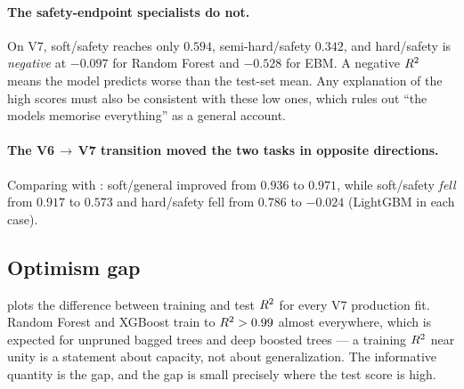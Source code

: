 \paragraph{The safety-endpoint specialists do not.}
\label{sec:safety-anomaly}
On V7, soft/safety reaches only $0.594$, semi-hard/safety $0.342$, and
hard/safety is \emph{negative} at $-0.097$ for Random Forest and
$-0.528$ for EBM. A negative $R^2$ means the model predicts worse than
the test-set mean. Any explanation of the high scores must also be
consistent with these low ones, which rules out ``the models memorise
everything'' as a general account.

\paragraph{The V6\,$\rightarrow$\,V7 transition moved the two tasks in
opposite directions.} Comparing  with
: soft/general improved from $0.936$ to
$0.971$, while soft/safety \emph{fell} from $0.917$ to $0.573$ and
hard/safety fell from $0.786$ to $-0.024$ (LightGBM in each case).



\subsection{Optimism gap}

 plots the difference between training
and test $R^2$ for every V7 production fit. Random Forest and XGBoost
train to $R^2 > 0.99$ almost everywhere, which is expected for
unpruned bagged trees and deep boosted trees --- a training $R^2$ near
unity is a statement about capacity, not about generalization. The
informative quantity is the gap, and the gap is small precisely where the
test score is high.



